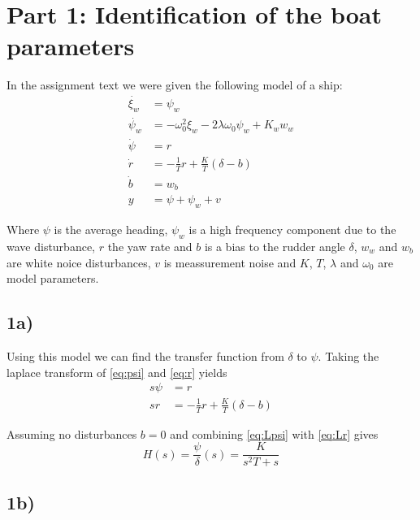 \section{Part 1: Identification of the boat  parameters}

In the assignment text we were given the following model of a ship:
\begin{subequations}
	\label{eq:completeModel}
		\begin{align}
				\dot{\xi_w} &= \psi_w \label{eq:xi_w}\\
				\dot{\psi_w} &= -\omega_0^2\xi_w-2\lambda\omega_0\psi_w+K_ww_w \label{eq:psi_w}\\
				\dot{\psi} &= r \label{eq:psi} \\
				\dot{r} &= -\frac{1}{T}r+\frac{K}{T}(\delta-b) \label{eq:r} \\
				\dot{b} &= w_b \label{eq:b} \\
				y &= \psi + \psi_w + v \label{eq:y}
		\end{align}
\end{subequations}

Where $\psi$ is the average heading, $\psi_w$ is a high frequency component due to the wave disturbance, $r$ the yaw rate and $b$ is a bias to the rudder angle $\delta$, $w_w$ and $w_b$ are white noice disturbances, $v$ is meassurement noise and $K$, $T$, $\lambda$ and $\omega_0$ are model parameters.


\subsection{1a)}

Using this model we can find the transfer function from $\delta$ to $\psi$. Taking the laplace transform of \cref{eq:psi} and \cref{eq:r} yields
\begin{subequations}
	\begin{align}
		s\psi &= r \label{eq:Lpsi}\\
		sr &= -\frac{1}{T}r + \frac{K}{T}(\delta-b) \label{eq:Lr}
	\end{align}
\end{subequations}

Assuming no disturbances $b = 0$ and combining \cref{eq:Lpsi} with \cref{eq:Lr} gives
\begin{equation}
	H(s) = \frac{\psi}{\delta}(s) = \frac{K}{s^2T+s} \label{eq:T_psi_delta}
\end{equation}

\subsection{1b)}

